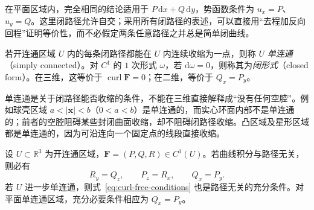 在平面区域内，完全相同的结论适用于 $P\,\mathrm dx+Q\,\mathrm dy$，势函数条件为 $u_x=P$、$u_y=Q$。这里闭路径允许自交；采用所有闭路径的表述，可以直接用“去程加反向回程”证明等价性，而不必假定两条任意路径之并总是简单闭曲线。

\begin{definition}
\label{def:simply-connected-and-closed-form}
若开连通区域 $U$ 内的每条闭路径都能在 $U$ 内连续收缩为一点，则称 $U$ \emph{单连通}（simply connected）。对 $C^1$ 的 $1$ 次形式 $\omega$，若 $\mathrm d\omega=0$，则称其为\emph{闭形式}（closed form）。在三维，这等价于 $\operatorname{curl}\boldsymbol F=0$；在二维，等价于 $Q_x=P_y$。
\end{definition}

单连通是关于闭路径能否收缩的条件，不能在三维直接解释成“没有任何空腔”。例如球壳区域 $a<|\boldsymbol x|<b$（$0<a<b$）是单连通的，而实心环面内部不是单连通的；前者的空腔阻碍某些封闭曲面收缩，却不阻碍闭路径收缩。凸区域及星形区域都是单连通的，因为可沿连向一个固定点的线段直接收缩。

\begin{theorem}
\label{thm:simply-connected-curl-free}
设 $U\subset\mathbb R^3$ 为开连通区域，$\boldsymbol F=(P,Q,R)\in C^1(U)$。若曲线积分与路径无关，则必有
\begin{equation}
\label{eq:curl-free-conditions}
    R_y=Q_z,\qquad P_z=R_x,\qquad Q_x=P_y.
\end{equation}
若 $U$ 进一步单连通，则式~\eqref{eq:curl-free-conditions} 也是路径无关的充分条件。对平面单连通区域，充分必要条件相应为 $Q_x=P_y$。
\end{theorem}

